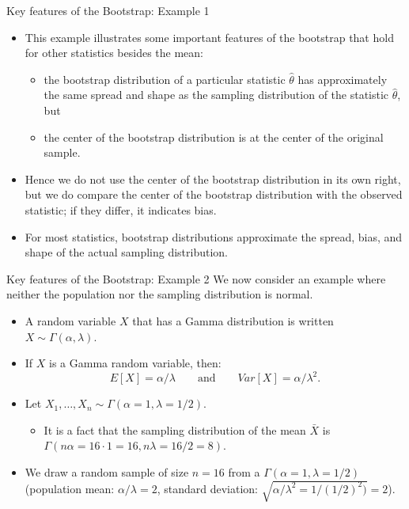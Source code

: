 \documentclass[
  ignorenonframetext,
]{beamer}
\providecommand{\tightlist}{%
  \setlength{\itemsep}{0pt}\setlength{\parskip}{0pt}}
\begin{document}
\begin{frame}{Key features of the Bootstrap: Example 1}
\label{key-features-of-the-bootstrap-example-1-4}
\begin{itemize}
\item
  This example illustrates some important features of the bootstrap that
  hold for other statistics besides the mean:

  \begin{itemize}
  \tightlist
  \item
    the bootstrap distribution of a particular statistic
    \(\hat{\theta}\) has approximately the same spread and shape as the
    sampling distribution of the statistic \(\hat{\theta}\), but
  \item
    the center of the bootstrap distribution is at the center of the
    original sample.
  \end{itemize}
\item
  Hence we do not use the center of the bootstrap distribution in its
  own right, but we do compare the center of the bootstrap distribution
  with the observed statistic; if they differ, it indicates bias.
\item
  For most statistics, bootstrap distributions approximate the spread,
  bias, and shape of the actual sampling distribution.
\end{itemize}
\end{frame}

\begin{frame}{Key features of the Bootstrap: Example 2}
\label{key-features-of-the-bootstrap-example-2}
We now consider an example where neither the population nor the sampling
distribution is normal.

\begin{itemize}
\item
  A random variable \(X\) that has a Gamma distribution is written
  \(X\sim \Gamma(\alpha, \lambda)\).
\item
  If \(X\) is a Gamma random variable, then:
  \[E[X]=\alpha/\lambda \quad \quad \text{and} \quad \quad Var[X]=\alpha/\lambda^2.\]
\item
  Let \(X_1, \ldots, X_n\sim \Gamma(\alpha = 1, \lambda = 1/2)\).

  \begin{itemize}
  \tightlist
  \item
    It is a fact that the sampling distribution of the mean \(\bar{X}\)
    is \(\Gamma(n\alpha = 16\cdot 1 = 16, n\lambda = 16/2 = 8)\).
  \end{itemize}
\item
  We draw a random sample of size \(n=16\) from a
  \(\Gamma(\alpha=1, \lambda=1/2)\) (population mean:
  \(\alpha/\lambda= 2\), standard deviation:
  \(\sqrt{\alpha/\lambda^2 = 1/(1/2)^2)}=2\)).
\end{itemize}
\end{frame}
\end{document}
